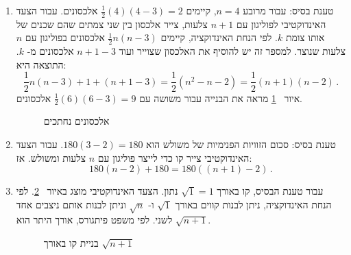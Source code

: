 \begin{enumerate}
\item
טענת בסיס: עבור מרובע 
$n=4$,
קיימים
$\frac{1}{2}(4)(4-3)=2$
אלכסונים. עבור הצעד האינדוקטיבי לפוליגון עם 
$n+1$
צלעות, צייר אלכסון בין שני צמתים שהם שכנים של אותו צומת 
$k$.
לפי הנחת האינדוקציה, קיימים
$\frac{1}{2}n(n-3)$
אלכסונים בפוליגון עם
$n$
צלעות שנוצר. למספר זה יש להוסיף את האלכסון שצוייר ועוד 
$n+1-3$
אלכסונים מ-%
$k$.
התוצאה היא:
\[
\frac{1}{2}n(n-3) + 1 + (n+1-3) =\frac{1}{2}(n^2-n-2)= \frac{1}{2}(n+1)(n-2)\,.
\] 
איור~%
\ref{fig.intersect}
מראה את הבנייה עבור משושה עם
$\frac{1}{2}(6)(6-3)=9$
אלכסונים.
\begin{figure}[bht]
\begin{center}
\caption{%
אלכסונים נחתכים%
}\label{fig.intersect}
\end{center}
\end{figure}

\vspace{-8ex}

\item 
טענת בסיס: סכום הזוויות הפנימיות של משולש הוא
$180(3-2)=180$.
עבור הצעד האינדוקטיבי צייר קו כדי לייצר פוליגון עם 
$n$
צלעות ומשולש. אז:
\[
180(n-2) + 180 = 180((n+1)-2)\,.
\]

\item
עבור טענת הבסיס, קו באורך 
$\sqrt{1}=1$
נתון. הצעד האינדוקטיבי מוצג באיור~%
\ref{fig.pyth}.
לפי הנחת האינדוקציה, ניתן לבנות קווים באורך 
$\sqrt{1}$
ו-%
$\sqrt{n}$
וניתן לבנות אותם ניצבים אחד לשני. לפי משפט פיתגורס, אורך היתר הוא
$\sqrt{n+1}$.

\begin{figure}[hbt]
\begin{center}
\caption{%
בניית קו באורך
$\sqrt{n+1}$}\label{fig.pyth}
\end{center}
\end{figure}


\end{enumerate}
